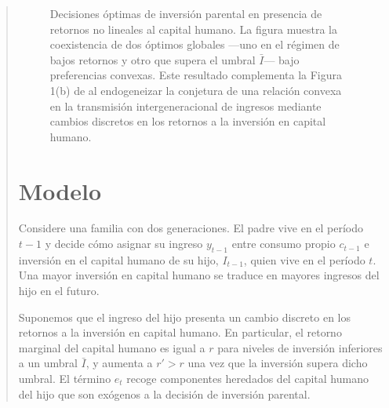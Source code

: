 \documentclass[12pt]{article}
\begin{document}
\begin{abstract}
\begin{figure}[ht]
\caption{Decisiones óptimas de inversión parental en presencia de retornos no lineales al capital humano. La figura muestra la coexistencia de dos óptimos globales —uno en el régimen de bajos retornos y otro que supera el umbral $\bar I$— bajo preferencias convexas. Este resultado complementa la Figura 1(b) de \textcite{Bratsberg_2007} al endogeneizar la conjetura de una relación convexa en la transmisión intergeneracional de ingresos mediante cambios discretos en los retornos a la inversión en capital humano.}

\label{fig:kink}
\end{figure}



\section{Modelo}

Considere una familia con dos generaciones. El padre vive en el período $t-1$ y decide cómo asignar su ingreso $y_{t-1}$ entre consumo propio $c_{t-1}$ e inversión en el capital humano de su hijo, $I_{t-1}$, quien vive en el período $t$. Una mayor inversión en capital humano se traduce en mayores ingresos del hijo en el futuro.

Suponemos que el ingreso del hijo presenta un cambio discreto en los retornos a la inversión en capital humano. En particular, el retorno marginal del capital humano es igual a $r$ para niveles de inversión inferiores a un umbral $\bar I$, y aumenta a $r' > r$ una vez que la inversión supera dicho umbral. El término $e_t$ recoge componentes heredados del capital humano del hijo que son exógenos a la decisión de inversión parental.


\end{abstract}
\end{document}
